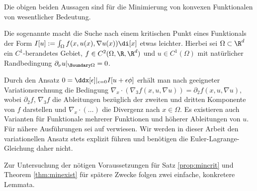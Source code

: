 \documentclass{mythesis}
\begin{document}
Die obigen beiden Aussagen sind für die Minimierung von konvexen Funktionalen von wesentlicher Bedeutung.

Die sogenannte  macht die Suche nach einem kritischen Punkt eines Funktionals der Form
\begin{math}
    I[u] := \int_\Omega f(x,u(x),\nabla u(x)) \di[x]
\end{math}
etwas leichter.
Hierbei sei $\Omega \subset \R^d$ ein $C^1$-berandetes Gebiet, $f \in C^2(\Omega, \R, \R^d)$ und $u \in C^1(\Omega)$ mit natürlicher Randbedingung $\partial_\nu u|_{\Boundary \Omega} = 0$.

Durch den Ansatz $0 = \ddx[\epsilon]|_{\epsilon=0} I[u + \epsilon\phi]$ erhält man nach geeigneter Variationsrechnung die Bedingung
\begin{math}
    \nabla_x \cdot (\nabla_3 f(x, u, \nabla u)) = \partial_2 f(x,u,\nabla u),
\end{math}
wobei $\partial_2 f$, $\nabla_3 f$ die Ableitungen bezüglich der zweiten und dritten Komponente von $f$ darstellen und $\nabla_x \cdot (\dotsc)$ die Divergenz nach $x \in \Omega$.
Es existieren auch Varianten für Funktionale mehrerer Funktionen und höherer Ableitungen von $u$.
Für nähere Ausführungen sei auf \cite{??} verwiesen.
Wir werden in dieser Arbeit den variationellen Ansatz stets explizit führen und benötigen die Euler-Lagrange-Gleichung daher nicht.

Zur Untersuchung der nötigen Voraussetzungen für Satz \ref{prop:mincrit} und Theorem \ref{thm:minexist} für spätere Zwecke folgen zwei einfache, konkretere Lemmata.
\end{document}
